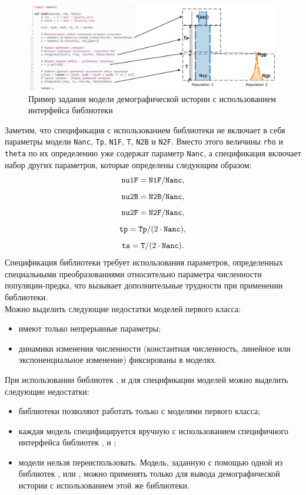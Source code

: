 \begin{figure}[ht]
    \centering
    \includegraphics[width=\linewidth]{images_2/momentsLD_model.pdf}
    \caption{Пример задания модели демографической истории с использованием интерфейса библиотеки~\momentsLD}
    \label{fig:momentsLD:model_spec}
\end{figure}

Заметим, что спецификация с использованием библиотеки \momentsLD не включает в себя параметры модели \texttt{Nanc}, \texttt{Tp}, \texttt{N1F}, \texttt{T}, \texttt{N2B} и \texttt{N2F}.
Вместо этого величины \texttt{rho} и \texttt{theta} по их определению уже содержат параметр \texttt{Nanc}, а спецификация включает набор других параметров, которые определены следующим образом:
$$\text{\texttt{nu1F}} = \text{\texttt{N1F}} / \text{\texttt{Nanc}},$$ 
$$\text{\texttt{nu2B}} = \text{\texttt{N2B}} / \text{\texttt{Nanc}},$$ 
$$\text{\texttt{nu2F}} = \text{\texttt{N2F}} / \text{\texttt{Nanc}},$$
$$\text{\texttt{tp}} = \text{\texttt{Tp}} / (2 \cdot \text{\texttt{Nanc}}),$$ 
$$\text{\texttt{ts}} = \text{\texttt{T}} / (2 \cdot \text{\texttt{Nanc}}).$$
Спецификация библиотеки \momentsLD требует использования параметров, определенных специальными преобразованиями относительно параметра численности популяции-предка, что вызывает дополнительные трудности при применении библиотеки. \\


Можно выделить следующие недостатки моделей первого класса:
\begin{itemize}
    \item имеют только непрерывные параметры;
    \item динамики изменения численности (константная численность, линейное или экспоненциальное изменение) фиксированы в моделях.\\
\end{itemize}

При использовании библиотек \dadi, \moments и \momentsLD для спецификации моделей можно выделить следующие недостатки:
\begin{itemize}
    \item библиотеки позволяют работать только с моделями первого класса;
    \item каждая модель специфицируется вручную с использованием специфичного интерфейса библиотек \dadi, \moments и \momentsLD;
    \item модели нельзя переиспользовать. Модель, заданную с помощью одной из библиотек \dadi, \moments или \momentsLD, можно применять только для вывода демографической истории с использованием этой же библиотеки.
\end{itemize}



